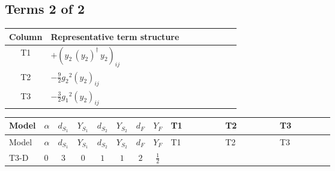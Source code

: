 \documentclass[8pt]{article}
\begin{document}
\begin{landscape}
\subsection*{Terms 2 of 2}
\begin{center}
\begin{tabular}{@{}c >{\raggedright\arraybackslash}p{0.82\linewidth}@{}}
\toprule
Column & Representative term structure \\
\midrule
T1 & \(\displaystyle +\left({y_2}\,\left({y_2}\right)^{\dagger}\,{y_2}\right)_{ij}\) \\
\midrule
T2 & \(\displaystyle -\frac{9}{2} {g_2}^2 \left({y_2}\right)_{ij}\) \\
\midrule
T3 & \(\displaystyle -\frac{3}{2} {g_1}^2 \left({y_2}\right)_{ij}\) \\
\midrule
\bottomrule
\end{tabular}
\end{center}
\smallskip
\tiny
\begin{longtable}{@{}llcccccc >{\raggedright\arraybackslash}p{0.21\linewidth} >{\raggedright\arraybackslash}p{0.21\linewidth} >{\raggedright\arraybackslash}p{0.21\linewidth}@{}}
\toprule
Model & $\alpha$ & $d_{S_1}$ & $Y_{S_1}$ & $d_{S_2}$ & $Y_{S_2}$ & $d_F$ & $Y_F$ & T1 & T2 & T3 \\
\midrule
\endfirsthead
\toprule
Model & $\alpha$ & $d_{S_1}$ & $Y_{S_1}$ & $d_{S_2}$ & $Y_{S_2}$ & $d_F$ & $Y_F$ & T1 & T2 & T3 \\
\midrule
\endhead
T3-D & $0$ & $3$ & $0$ & $1$ & $1$ & $2$ & $\frac{1}{2}$ & \scriptsize\adjustbox{max width=\linewidth}{$\begin{gathered} +\left({y_2}\,\left({y_2}\right)^{\dagger}\,{y_2}\right)_{ij}\end{gathered}$} & \scriptsize\adjustbox{max width=\linewidth}{$\begin{gathered} -\frac{9}{2} {g_2}^2 \left({y_2}\right)_{ij}\end{gathered}$} & \scriptsize\adjustbox{max width=\linewidth}{$\begin{gathered} -\frac{3}{2} {g_1}^2 \left({y_2}\right)_{ij}\end{gathered}$} \\
\midrule
\bottomrule
\end{longtable}
\clearpage

\end{landscape}
\end{document}
